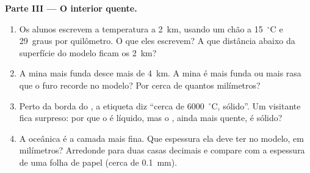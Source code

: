\begin{problem}
\medskip
\noindent\textbf{Parte III --- O interior quente.}
\begin{enumerate}[resume]
  \item Os alunos escrevem a temperatura a 2~km, usando um chão a
        15~$^\circ$C e 29~graus por quilômetro. O que eles escrevem? A que
        distância abaixo da superfície do modelo ficam os 2~km?
  \item A mina mais funda desce mais de 4~km. A mina é mais funda ou mais
        rasa que o furo recorde no modelo? Por cerca de quantos milímetros?
  \item Perto da borda do , a etiqueta diz ``cerca de
        6000~$^\circ$C, sólido''. Um visitante fica surpreso: por que o
         é líquido, mas o , ainda mais quente,
        é sólido?
  \item A  oceânica é a camada mais fina. Que espessura ela deve ter
        no modelo, em milímetros? Arredonde para duas casas decimais e
        compare com a espessura de uma folha de papel (cerca de 0.1~mm).
\end{enumerate}
\end{problem}
